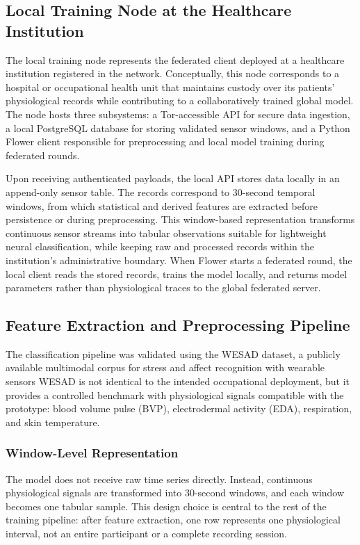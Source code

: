 \documentclass[12pt]{article}
\begin{document}
\subsection{Local Training Node at the Healthcare Institution}

The local training node represents the federated client deployed at a healthcare institution registered in the network. Conceptually, this node corresponds to a hospital or occupational health unit that maintains custody over its patients' physiological records while contributing to a collaboratively trained global model. The node hosts three subsystems: a Tor-accessible API for secure data ingestion, a local PostgreSQL database for storing validated sensor windows, and a Python Flower client responsible for preprocessing and local model training during federated rounds.

Upon receiving authenticated payloads, the local API stores data locally in an append-only sensor table. The records correspond to 30-second temporal windows, from which statistical and derived features are extracted before persistence or during preprocessing. This window-based representation transforms continuous sensor streams into tabular observations suitable for lightweight neural classification, while keeping raw and processed records within the institution's administrative boundary. When Flower starts a federated round, the local client reads the stored records, trains the model locally, and returns model parameters rather than physiological traces to the global federated server.

\subsection{Feature Extraction and Preprocessing Pipeline}

The classification pipeline was validated using the WESAD dataset, a publicly available multimodal corpus for stress and affect recognition with wearable sensors WESAD is not identical to the intended occupational deployment, but it provides a controlled benchmark with physiological signals compatible with the prototype: blood volume pulse (BVP), electrodermal activity (EDA), respiration, and skin temperature.

\subsubsection{Window-Level Representation}

The model does not receive raw time series directly. Instead, continuous physiological signals are transformed into 30-second windows, and each window becomes one tabular sample. This design choice is central to the rest of the training pipeline: after feature extraction, one row represents one physiological interval, not an entire participant or a complete recording session.
\end{document}
